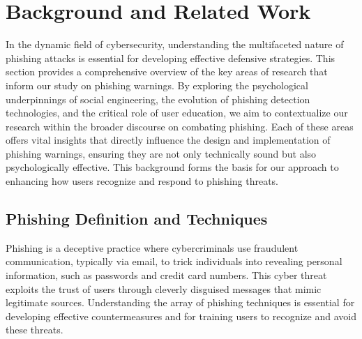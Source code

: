 \documentclass[
  a4paper,  %
  twoside,  %
  bibliography=totoc,
  headsepline,
  cleardoublepage=empty,
  parskip=half,
  draft=false
]{scrbook}
\begin{document}

\chapter{Background and Related Work}
\label{sec:relatedwork}

In the dynamic field of cybersecurity, understanding the multifaceted nature of phishing attacks is essential for developing effective defensive strategies. This section provides a comprehensive overview of the key areas of research that inform our study on phishing warnings. By exploring the psychological underpinnings of social engineering, the evolution of phishing detection technologies, and the critical role of user education, we aim to contextualize our research within the broader discourse on combating phishing. Each of these areas offers vital insights that directly influence the design and implementation of phishing warnings, ensuring they are not only technically sound but also psychologically effective. This background forms the basis for our approach to enhancing how users recognize and respond to phishing threats.

\section{Phishing Definition and Techniques}
Phishing is a deceptive practice where cybercriminals use fraudulent communication, typically via email, to trick individuals into revealing personal information, such as passwords and credit card numbers. This cyber threat exploits the trust of users through cleverly disguised messages that mimic legitimate sources. Understanding the array of phishing techniques is essential for developing effective countermeasures and for training users to recognize and avoid these threats.
\end{document}
